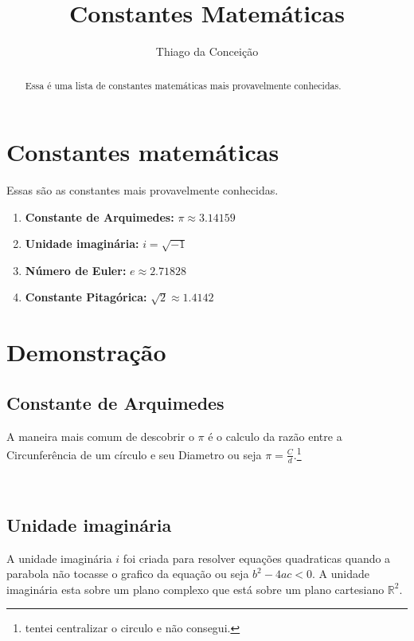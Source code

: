 \documentclass[a4paper]{article}
\title{Constantes Matemáticas}
\author{Thiago da Conceição}
\date{}
\begin{document}
\maketitle
\tableofcontents


\begin{abstract}
Essa é uma lista de constantes matemáticas mais provavelmente conhecidas.
\end{abstract}

\section{Constantes matemáticas}
Essas são as constantes mais provavelmente conhecidas.

\begin{enumerate}
  \item \textbf{Constante de Arquimedes:} $\pi \approx 3.14159$
  \item \textbf{Unidade imaginária:} $i = \sqrt{-1}$
  \item \textbf{Número de Euler:} $e \approx 2.71828$
  \item \textbf{Constante Pitagórica:} $\sqrt{2} \approx 1.4142$
\end{enumerate}

\section{Demonstração}
\subsection{Constante de Arquimedes}
A maneira mais comum de descobrir o $\pi$ é o calculo da razão entre a Circunferência de um círculo e seu Diametro ou seja $\pi = \frac{C}{d}$.\footnote{tentei centralizar o circulo e não consegui.}\\

\\

\subsection{Unidade imaginária}
A unidade imaginária $i$ foi criada para resolver equações quadraticas quando a parabola não tocasse o grafico da equação ou seja $b^2 - 4ac<0$.
A unidade imaginária esta sobre um plano complexo que está sobre um plano cartesiano $\mathbb{R}^2$.\\
\end{document}
